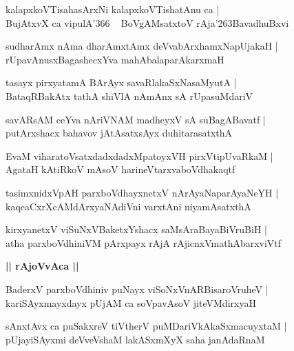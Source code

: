 \documentclass[twoside,12pt,openright]{book}
\def\S{\char'263}
\newcounter{shloka}[chapter]
\def\uvaca#1{\centerline{{\large\textbf{#1}}}}
\begin{document}
\begin{shloka}%
kalapxkoVTisahasArxNi kalapxkoVTishatAnu ca |\\
BujAtxvX ca vipulA\char'366 ~ BoVgAMsatxtoV rAja\S BavadhuBxvi
\end{shloka}

\begin{shloka}%
sudharAmx nAma dharAmxtAmx deVvabArxhamxNapUjakaH |\\
rUpavAnusxBagashecxYva mahAbalaparAkarxmaH
\end{shloka}

\begin{shloka}%
tasayx pirxyatamA BArAyx savaRlakaSxNasaMyutA |\\
BataqRBakAtx tathA shiVlA nAmAnx sA rUpasuMdariV 
\end{shloka}

\begin{shloka}%
savARsAM ceYva nAriVNAM madheyxV sA suBagABavatf |\\
putArxshacx bahavov jAtAsatxsAyx duhitarasatxthA
\end{shloka}

\begin{shloka}%
EvaM viharatoVsatxdadxdadxMpatoyxVH pirxVtipUvaRkaM |\\
AgataH kAtiRkoV mAsoV harineVtarxvaboVdhakaqtf
\end{shloka}

\begin{shloka}%
tasimxnidxVpAH parxboVdhayxnetxV nArAyaNaparAyaNeYH |\\
kaqcaCxrXcAMdArxyaNAdiVni varxtAni niyamAsatxthA
\end{shloka}

\begin{shloka}%
kirxyanetxV viSuNxVBaketxYshacx saMsAraBayaBiVruBiH |\\
atha parxboVdhiniVM pArxpayx rAjA rAjicnxVmathAbarxviVtf
\end{shloka}

\uvaca{|| rAjoVvAca ||}

\begin{shloka}%
BaderxV parxboVdhiniv puNayx viSoNxVnARBisaroVruheV |\\
kariSAyxmayxdayx pUjAM ca soVpavAsoV jiteVMdirxyaH
\end{shloka}

\begin{shloka}%
sAnxtAvx ca puSakxreV tiVtherV puMDariVkAkaSxmacuyxtaM |\\
pUjayiSAyxmi deVveVshaM lakASxmXyX saha janAdaRnaM 
\end{shloka}
\end{document}
